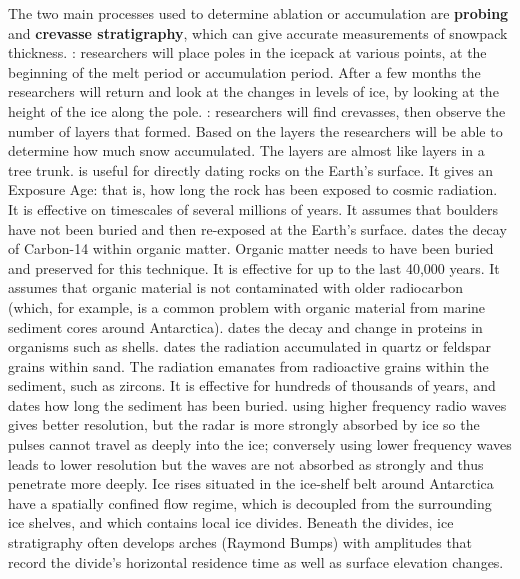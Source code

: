 	    \ddd The two main processes used to determine ablation or accumulation are \textbf{probing} and \textbf{crevasse stratigraphy}, which can give accurate measurements of snowpack thickness.
	    : researchers will place poles in the icepack at various points, at the beginning of the melt period or accumulation period. After a few months the researchers will return and look at the changes in levels of ice, by looking at the height of the ice along the pole.
	    : researchers will find crevasses, then observe the number of layers that formed. Based on the layers the researchers will be able to determine how much snow accumulated. The layers are almost like layers in a tree trunk.
	     is useful for directly dating rocks on the Earth’s surface. It gives an Exposure Age: that is, how long the rock has been exposed to cosmic radiation. It is effective on timescales of several millions of years. It assumes that boulders have not been buried and then re-exposed at the Earth’s surface.
	     dates the decay of Carbon-14 within organic matter. Organic matter needs to have been buried and preserved for this technique. It is effective for up to the last 40,000 years. It assumes that organic material is not contaminated with older radiocarbon (which, for example, is a common problem with organic material from marine sediment cores around Antarctica).
	     dates the decay and change in proteins in organisms such as shells.
	     dates the radiation accumulated in quartz or feldspar grains within sand. The radiation emanates from radioactive grains within the sediment, such as zircons. It is effective for hundreds of thousands of years, and dates how long the sediment has been buried.
			using higher frequency radio waves gives better resolution, but the radar is more strongly absorbed by ice so the pulses cannot travel as deeply into the ice; conversely using lower frequency waves leads to lower resolution but the waves are not absorbed as strongly and thus penetrate more deeply. 
			Ice rises situated in the ice-shelf belt around Antarctica have a spatially confined  flow regime, which is decoupled from the surrounding ice shelves, and which contains local ice divides. Beneath the divides, ice stratigraphy often develops arches (Raymond Bumps) with amplitudes that record the divide’s horizontal residence time as well as surface elevation changes. 

